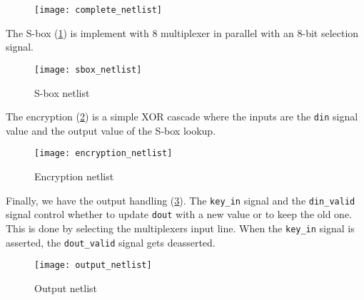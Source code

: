 \clearpage
{}
\begin{figure}
    \thispagestyle{empty}
    \centering
    \hspace*{-9cm}
    \texttt{[image: complete\_netlist]}
\end{figure}
\restoregeometry
\clearpage

The S-box (\cref{fig:sbox_netlist}) is implement with 8 multiplexer in parallel with an 8-bit selection signal.
\begin{figure}[!ht]
    \centering
    \texttt{[image: sbox\_netlist]}
    \caption{S-box netlist}
    \label{fig:sbox_netlist}
\end{figure}

The encryption (\cref{fig:encryption_netlist}) is a simple XOR cascade where the inputs are the \lstinline{din} signal value and the output value of the S-box lookup.
\begin{figure}
    \centering
    \texttt{[image: encryption\_netlist]}
    \caption{Encryption netlist}
    \label{fig:encryption_netlist}
\end{figure}

Finally, we have the output handling (\cref{fig:output_netlist}). The \lstinline{key_in} signal and the \lstinline{din_valid} signal control whether to update \lstinline{dout} with a new value or to keep the old one. This is done by selecting the multiplexers input line. When the \lstinline{key_in} signal is asserted, the \lstinline{dout_valid} signal gets deasserted.
\begin{figure}
    \centering
    \texttt{[image: output\_netlist]}
    \caption{Output netlist}
    \label{fig:output_netlist}
\end{figure}